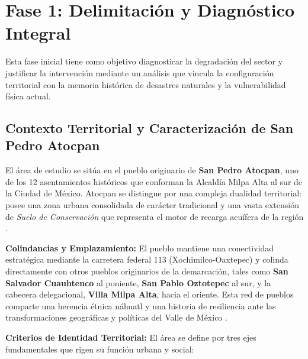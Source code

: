 \section{Fase 1: Delimitación y Diagnóstico Integral}
\label{sec:delimitacion-diagnostico}

Esta fase inicial tiene como objetivo diagnosticar la degradación del sector y 
justificar la intervención mediante un análisis que vincula la configuración 
territorial con la memoria histórica de desastres naturales y la vulnerabilidad 
física actual.

\subsection{Contexto Territorial y Caracterización de San Pedro Atocpan}
\label{ssec:contexto-territorial}

El área de estudio se sitúa en el pueblo originario de \textbf{San Pedro Atocpan}, 
uno de los 12 asentamientos históricos que conforman la Alcaldía Milpa Alta al 
sur de la Ciudad de México. Atocpan se distingue por una compleja dualidad 
territorial: posee una zona urbana consolidada de carácter tradicional y una 
vasta extensión de \textit{Suelo de Conservación} que representa el motor de 
recarga acuífera de la región \cite{secretaria_economia_datamexico}.

\textbf{Colindancias y Emplazamiento:}
El pueblo mantiene una conectividad estratégica mediante la carretera federal 113 
(Xochimilco-Oaxtepec) y colinda directamente con otros pueblos originarios de la 
demarcación, tales como \textbf{San Salvador Cuauhtenco} al poniente, 
\textbf{San Pablo Oztotepec} al sur, y la cabecera delegacional, 
\textbf{Villa Milpa Alta}, hacia el oriente. Esta red de pueblos 
comparte una herencia étnica náhuatl y una historia de resiliencia ante las 
transformaciones geográficas y políticas del Valle de México \cite{SEDATU2023}.

\textbf{Criterios de Identidad Territorial:}
El área se define por tres ejes fundamentales que rigen su función urbana y social:

